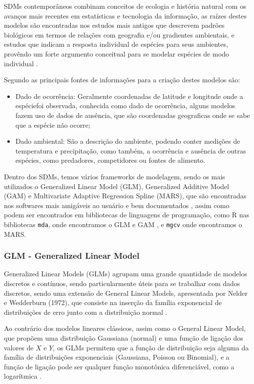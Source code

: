 \documentclass[
	12pt,				%
	openright,			%
	oneside,			%
	a4paper,			%
	english,			%
	brazil				%
	]{abntex2}
\begin{document}
SDMs contemporâneos combinam conceitos de ecologia e história natural com os avanços mais recentes em estatísticas e 
tecnologia da informação, as raízes destes modelos são encontradas nos estudos mais antigos que descrevem padrões biológicos 
em termos de relações com geografia e/ou gradientes ambientais, e estudos que indicam a resposta individual de espécies 
para seus ambientes, provêndo um forte argumento conceitual para se modelar espécies de modo individual \cite{speciesDistributionModels}.

Segundo \cite{tiposDados_sdm} as principais fontes de informações para a criação destes modelos são: 
\begin{itemize}
	\item Dado de ocorrência: Geralmente coordenadas de latitude e longitude onde a espéciefoi observada, conhecida como
	dado de ocorrência, alguns modelos fazem uso de dados de ausência, que são coordenadas geograficas 
	onde se sabe que a espécie não ocorre;
	\item Dado ambiental: São a descrição do ambiente, podendo conter medições de temperatura e precipitação, como
	também, a ocorrência e ausência de outras espécies, como predadores, competidores ou fontes de alimento.
\end{itemize}

Dentro dos SDMs, temos vários frameworks de modelagem, sendo os mais utilizados o Generalized Linear Model (GLM), 
Generalized Additive Model (GAM) e Multivariate Adaptive Regression Spline (MARS), que são encontradas nos
softwares mais amigáveis ao usuário e bem documentados \cite{predPerform33models}, assim como podem ser encontrados em 
bibliotecas de linguagens de programação, como R nas bibliotecas \lstinline|mda|, onde encontramos o GLM e GAM \cite{mda},
e \lstinline|mgcv| onde encontramos o MARS\cite{mgcv}.

\subsubsection{GLM - Generalized Linear Model}

Generalized Linear Models (GLMs) agrupam uma grande quantidade de modelos discretos e contínuos, sendo particularmente úteis 
para se trabalhar com dados discretos, sendo uma extensão de General Linear Models, apresentada por Nelder e Wedderburn 
(1972), que consiste na inserção da família exponencial de distribuições de erro junto com a distribuição normal \cite{GLM}.

Ao contrário dos modelos lineares clássicos, assim como o General Linear Model, que propõem uma distribuição Gaussiana (normal) 
e uma função de ligação dos valores de $X$ e $Y$, os GLMs permitem que a função de distribuição seja alguma da família de distribuições 
exponenciais (Gaussiana, Poisson ou Binomial), e a função de ligação pode ser qualquer função monotônica 
diferenciável, como a logarítmica \cite{GAMeGLM_especie_estudo}.
\end{document}
